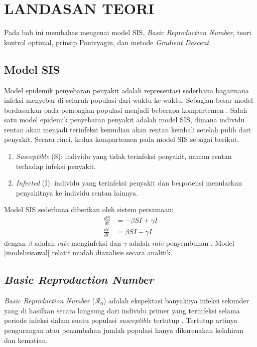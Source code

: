 \chapter{\normalsize LANDASAN TEORI}
Pada bab ini membahas mengenai model SIS, \textit{Basic Reproduction Number}, teori kontrol optimal, prinsip Pontryagin, dan metode \textit{Gradient Descent}.

\lipsum[2-3]

\section{\normalsize Model SIS}
Model epidemik penyebaran penyakit adalah representasi sederhana bagaimana infeksi menyebar di seluruh populasi dari waktu ke waktu. Sebagian besar model berdasarkan pada pembagian populasi menjadi beberapa kompartemen \citep{Lenhart}. Salah satu model epidemik penyebaran penyakit adalah model SIS, dimana individu rentan akan menjadi terinfeksi kemudian akan rentan kembali setelah pulih dari penyakit. Secara rinci, kedua kompartemen pada model SIS sebagai berikut.
\begin{enumerate}
\item \textit{Susceptible} (S): individu yang tidak terinfeksi penyakit, namun rentan terhadap infeksi penyakit.
\item \textit{Infected} (I): individu yang terinfeksi penyakit dan berpotensi menularkan penyakitnya ke individu rentan lainnya.
\end{enumerate}
Model SIS sederhana diberikan oleh sistem persamaan:
\begin{align}
\frac{dS}{dt}&=-\beta SI+\gamma I \nonumber\\
\frac{dI}{dt}&=\beta SI-\gamma I \label{model:sisawal}
\end{align}
dengan $\beta$ adalah \textit{rate} menginfeksi dan $\gamma$ adalah \textit{rate} penyembuhan \citep{Martcheva}. Model \eqref{model:sisawal} relatif mudah dianalisis secara analitik.

\section{\normalsize \textit{Basic Reproduction Number}}
\textit{Basic Reproduction Number} ($\mathscr{R}_0$) adalah ekspektasi banyaknya infeksi sekunder yang di hasilkan secara langsung dari individu primer yang terinfeksi selama periode infeksi dalam suatu populasi \textit{susceptible} tertutup \citep{Diekmann}.  Tertutup artinya pengurangan atau penambahan jumlah populasi hanya dikarenakan kelahiran dan kematian.

